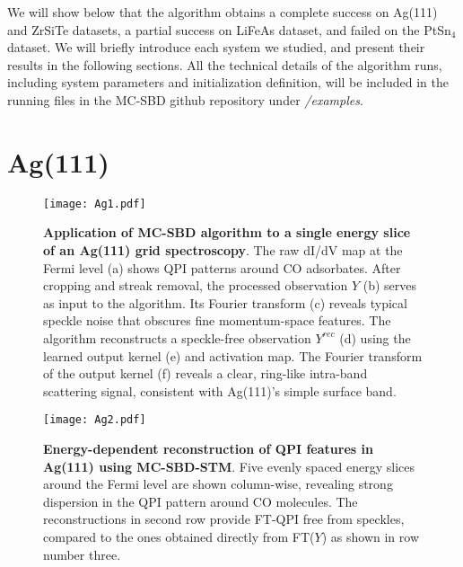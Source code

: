 We will show below that the algorithm obtains a complete success on Ag(111) and ZrSiTe datasets, a partial success on LiFeAs dataset, and failed on the PtSn$_4$ dataset.  We will briefly introduce each system we studied, and present their results in the following sections. All the technical details of the algorithm runs, including system parameters and initialization definition, will be included in the running files in the MC-SBD github repository under \textit{\slash examples}. 

\section{Ag(111)}

\begin{figure}
	\texttt{[image: Ag1.pdf]} 
	\centering
	\caption[\textbf{Application of MC-SBD algorithm to a single energy slice of an Ag(111) grid spectroscopy}]{\textbf{Application of MC-SBD algorithm to a single energy slice of an Ag(111) grid spectroscopy}. The raw dI/dV map at the Fermi level (a) shows QPI patterns around CO adsorbates. After cropping and streak removal, the processed observation $Y$ (b) serves as input to the algorithm. Its Fourier transform (c) reveals typical speckle noise that obscures fine momentum-space features. The algorithm reconstructs a speckle-free observation $Y^{rec}$ (d) using the learned output kernel (e) and activation map. The Fourier transform of the output kernel (f) reveals a clear, ring-like intra-band scattering signal, consistent with Ag(111)’s simple surface band. }
	\label{fig:Ag1}
\end{figure}

\begin{figure}
	\texttt{[image: Ag2.pdf]} 
	\centering
	\caption{\textbf{Energy-dependent reconstruction of QPI features in Ag(111) using MC-SBD-STM}. Five evenly spaced energy slices around the Fermi level are shown column-wise, revealing strong dispersion in the QPI pattern around CO molecules. The reconstructions in second row provide FT-QPI free from speckles, compared to the ones obtained directly from FT($Y$) as shown in row number three.}
	\label{fig:Ag2}
\end{figure}

